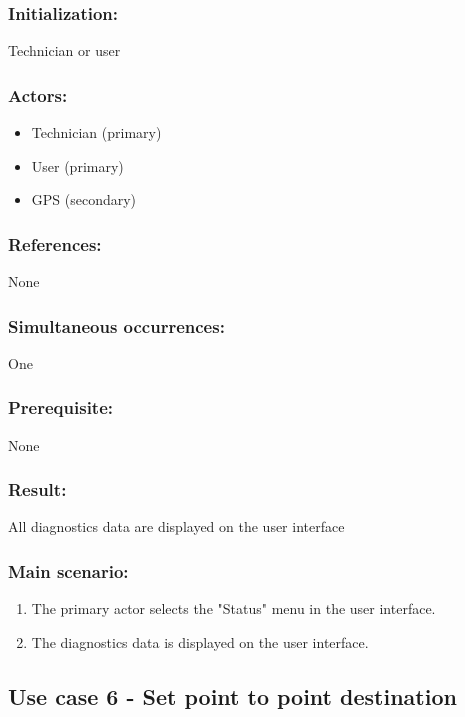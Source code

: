 \subsubsection*{Initialization:}
Technician or user

\subsubsection*{Actors:}
\begin{itemize}
	\item Technician (primary)
	\item User (primary)
	\item GPS (secondary)
\end{itemize}

\subsubsection*{References:}
None

\subsubsection*{Simultaneous occurrences:}
One

\subsubsection*{Prerequisite:}
None

\subsubsection*{Result:}
All diagnostics data are displayed on the user interface

\subsubsection*{Main scenario:}
\begin{enumerate}
	\item The primary actor selects the "Status" menu in the user interface.
	\item The diagnostics data is displayed on the user interface. 
\end{enumerate}


\subsection{Use case 6 - Set point to point destination}
